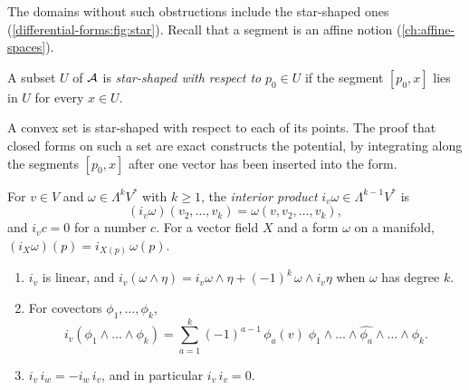 \begin{notechapter}
The domains without such obstructions include the star-shaped ones
(\cref{differential-forms:fig:star}).
Recall that a segment is an affine notion
(\cref{ch:affine-spaces}).

\begin{definition}\label{differential-forms:def:star}
A subset $U$ of $\mathcal{A}$ is \emph{star-shaped with respect to}
$p_0\in U$ if the segment $[p_0, x]$ lies in $U$ for every $x\in U$.
\end{definition}

A convex set is star-shaped with respect to each of its points. The
proof that closed forms on such a set are exact constructs the
potential, by integrating along the segments $[p_0, x]$ after one
vector has been inserted into the form.

\begin{definition}\label{differential-forms:def:interior}
For $v\in V$ and $\omega\in\Lambda^kV^*$ with $k\geq1$, the
\emph{interior product} $i_v\omega\in\Lambda^{k-1}V^*$ is
\[
  (i_v\omega)(v_2,\dots,v_k) = \omega(v, v_2,\dots,v_k) ,
\]
and $i_vc = 0$ for a number $c$. For a vector field $X$ and a form
$\omega$ on a manifold, $(i_X\omega)(p) = i_{X(p)}\,\omega(p)$.
\end{definition}

\begin{proposition}
\label{differential-forms:prop:interior}
\begin{enumerate}[nosep]
  \item $i_v$ is linear, and
        $i_v(\omega\wedge\eta)
        = i_v\omega\wedge\eta + (-1)^k\,\omega\wedge i_v\eta$ when
        $\omega$ has degree $k$.
  \item For covectors $\phi_1,\dots,\phi_k$,
        \[
          i_v(\phi_1\wedge\dots\wedge\phi_k)
          = \sum_{a=1}^k(-1)^{a-1}\,\phi_a(v)\;
            \phi_1\wedge\dots\wedge\widehat{\phi_a}\wedge\dots
            \wedge\phi_k .
        \]
  \item $i_v\,i_w = -i_w\,i_v$, and in particular $i_v\,i_v = 0$.
\end{enumerate}
\end{proposition}


\end{notechapter}
